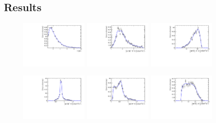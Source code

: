 

\subsection{Results}

\begin{figure}[h]
	\centering
		\includegraphics[width=0.3\textwidth, height = !]{figs/fullFit/signal/h_t.pdf} 
		\includegraphics[width=0.3\textwidth, height = !]{figs/fullFit/signal/s_Kpipi.pdf} 
		\includegraphics[width=0.3\textwidth, height = !]{figs/fullFit/signal/s_Dspipi.pdf} 

		\includegraphics[width=0.3\textwidth, height = !]{figs/fullFit/signal/s_Kpi.pdf} 
		\includegraphics[width=0.3\textwidth, height = !]{figs/fullFit/signal/s_pipi.pdf} 
		\includegraphics[width=0.3\textwidth, height = !]{figs/fullFit/signal/s_Dspi.pdf} 

		\caption{} 		
\end{figure}	